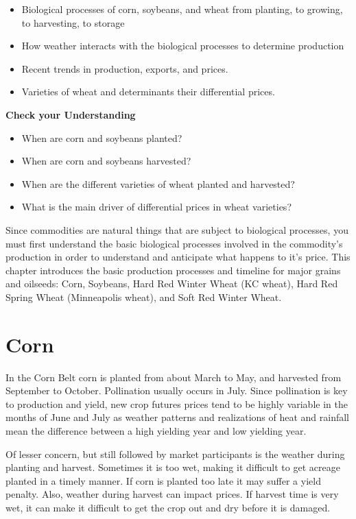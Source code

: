 \documentclass[
  letterpaper,
  DIV=11,
  numbers=noendperiod]{scrreprt}
\providecommand{\tightlist}{%
  \setlength{\itemsep}{0pt}\setlength{\parskip}{0pt}}\usepackage{longtable,booktabs,array}
\begin{document}
\begin{itemize}
\tightlist
\item
  Biological processes of corn, soybeans, and wheat from planting, to
  growing, to harvesting, to storage
\item
  How weather interacts with the biological processes to determine
  production
\item
  Recent trends in production, exports, and prices.
\item
  Varieties of wheat and determinants their differential prices.
\end{itemize}

\textbf{Check your Understanding}

\begin{itemize}
\tightlist
\item
  When are corn and soybeans planted?
\item
  When are corn and soybeans harvested?
\item
  When are the different varieties of wheat planted and harvested?
\item
  What is the main driver of differential prices in wheat varieties?
\end{itemize}

Since commodities are natural things that are subject to biological
processes, you must first understand the basic biological processes
involved in the commodity's production in order to understand and
anticipate what happens to it's price. This chapter introduces the basic
production processes and timeline for major grains and oilseeds: Corn,
Soybeans, Hard Red Winter Wheat (KC wheat), Hard Red Spring Wheat
(Minneapolis wheat), and Soft Red Winter Wheat.

\hypertarget{corn}{%
\section{Corn}\label{corn}}

In the Corn Belt corn is planted from about March to May, and harvested
from September to October. Pollination usually occurs in July. Since
pollination is key to production and yield, new crop futures prices tend
to be highly variable in the months of June and July as weather patterns
and realizations of heat and rainfall mean the difference between a high
yielding year and low yielding year.

Of lesser concern, but still followed by market participants is the
weather during planting and harvest. Sometimes it is too wet, making it
difficult to get acreage planted in a timely manner. If corn is planted
too late it may suffer a yield penalty. Also, weather during harvest can
impact prices. If harvest time is very wet, it can make it difficult to
get the crop out and dry before it is damaged.
\end{document}
